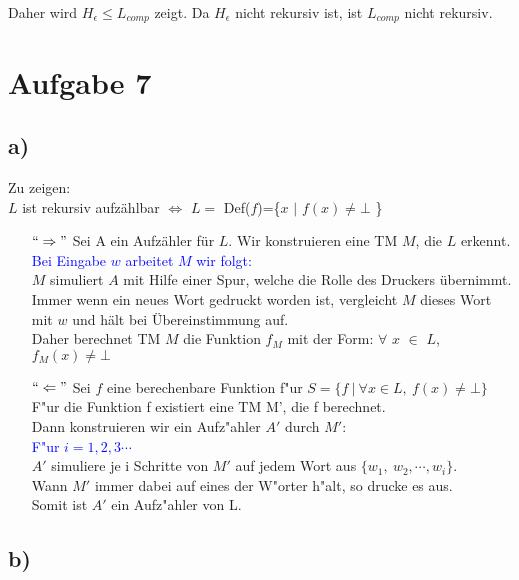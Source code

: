 \documentclass[a4paper,11pt]{scrartcl}
\begin{document}
	Daher wird $H_\epsilon \leq L_{comp}$ zeigt. Da $H_\epsilon$ nicht rekursiv ist, ist $L_{comp}$ nicht rekursiv.
	
	
\section*{Aufgabe 7}
\subsection*{a)}
	Zu zeigen:\\
	$L$ ist rekursiv aufz{\"a}hlbar $\iff$ $L=$ Def($f$)=\{$x$ $|$ $f(x) \ne \bot$ \}
	\begin{itemize}		
		\item[$``\Rightarrow "$] Sei A ein Aufz{\"a}hler f{\"u}r $L$. Wir konstruieren eine TM $M$, die $L$ erkennt.\\
		\textcolor{blue} {Bei Eingabe $w$ arbeitet $M$ wir folgt:}\\
		$M$ simuliert $A$ mit Hilfe einer Spur, welche die Rolle des Druckers {\"u}bernimmt.\\
		Immer wenn ein neues Wort gedruckt worden ist, vergleicht $M$ dieses Wort mit $w$ und h{\"a}lt bei {\"U}bereinstimmung auf.\\
		Daher berechnet TM $M$ die Funktion $f_M$ mit der Form: $\forall$ $x$ $\in$ $L$, $f_M(x) \ne \bot$
		
		\item[$``\Leftarrow "$] 
		Sei $f$ eine berechenbare Funktion f"ur $S=\{f\ |\ \forall x\in L,\ f(x)\ne \bot\}$\\
		F"ur die Funktion f existiert eine TM M', die f berechnet.\\
		Dann konstruieren wir ein Aufz"ahler $A'$ durch $M'$:\\
		\textcolor{blue}{F"ur $i = 1, 2, 3\cdots$ }\\
		$A'$ simuliere je i Schritte von $M'$ auf jedem Wort aus $\{w_1,\ w_2,\cdots ,w_i\}$.\\
		Wann $M'$ immer dabei auf eines der W"orter h"alt, so drucke es aus.\\
		Somit ist $A'$ ein Aufz"ahler von L.
	\end{itemize}

\subsection*{b)}
\end{document}
